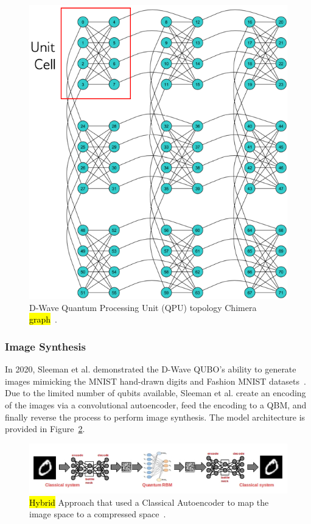 \documentclass[technologies,article,accept,pdftex,moreauthors]{Definitions/mdpi}
\begin{document}
\begin{figure}[H]
    \includegraphics[width=0.95\columnwidth]{chimera.png}
    \caption{\label{fig:chimera}D-Wave Quantum Processing Unit (QPU) topology Chimera \hl{graph}~\cite{dwavedocs}.}
\end{figure}



\subsubsection{Image Synthesis}
In 2020, Sleeman et al. demonstrated the D-Wave QUBO's ability to generate images mimicking the MNIST hand-drawn digits and Fashion MNIST datasets~\cite{qmlimggen}. Due to the limited number of qubits available, Sleeman et al. create an encoding of the images via a convolutional autoencoder, feed the encoding to a QBM, and finally reverse the process to perform image synthesis. The model architecture is provided in Figure~\ref{fig:hybridML}.

\begin{figure}[H]
    \includegraphics[width=\textwidth]{qmlimgimg.png}
    \caption{\label{fig:hybridML}\hl{Hybrid} %
 Approach that used a Classical Autoencoder to map the image space to a compressed space~\cite{qmlimggen}.}
\end{figure}
\end{document}
